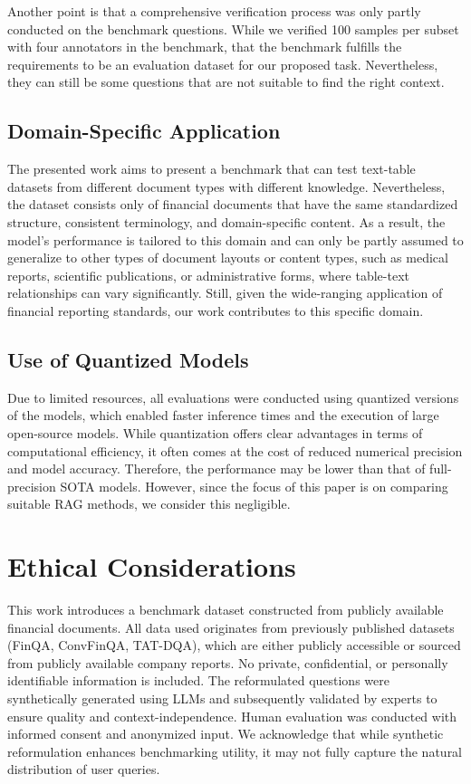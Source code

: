 \documentclass[10pt]{article}
\begin{document}
Another point is that a comprehensive verification process was only partly conducted on the benchmark questions. While we verified 100 samples per subset with four annotators in the benchmark, that the benchmark fulfills the requirements to be an evaluation dataset for our proposed task. Nevertheless, they can still be some questions that are not suitable to find the right context.

\subsection*{Domain-Specific Application}
The presented work aims to present a benchmark that can test text-table datasets from different document types with different knowledge. Nevertheless, the dataset consists only of financial documents that have the same standardized structure, consistent terminology, and domain-specific content. As a result, the model’s performance is tailored to this domain and can only be partly assumed to generalize to other types of document layouts or content types, such as medical reports, scientific publications, or administrative forms, where table-text relationships can vary significantly. Still, given the wide-ranging application of financial reporting standards, our work contributes to this specific domain.

\subsection*{Use of Quantized Models}
Due to limited resources, all evaluations were conducted using quantized versions of the models, which enabled faster inference times and the execution of large open-source models. While quantization offers clear advantages in terms of computational efficiency, it often comes at the cost of reduced numerical precision and model accuracy. Therefore, the performance may be lower than that of full-precision SOTA models. However, since the focus of this paper is on comparing suitable RAG methods, we consider this negligible.

\section*{Ethical Considerations}
This work introduces a benchmark dataset constructed from publicly available financial documents. All data used originates from previously published datasets (FinQA, ConvFinQA, TAT-DQA), which are either publicly accessible or sourced from publicly available company reports. No private, confidential, or personally identifiable information is included. The reformulated questions were synthetically generated using LLMs and subsequently validated by experts to ensure quality and context-independence. Human evaluation was conducted with informed consent and anonymized input. We acknowledge that while synthetic reformulation enhances benchmarking utility, it may not fully capture the natural distribution of user queries.
\end{document}
